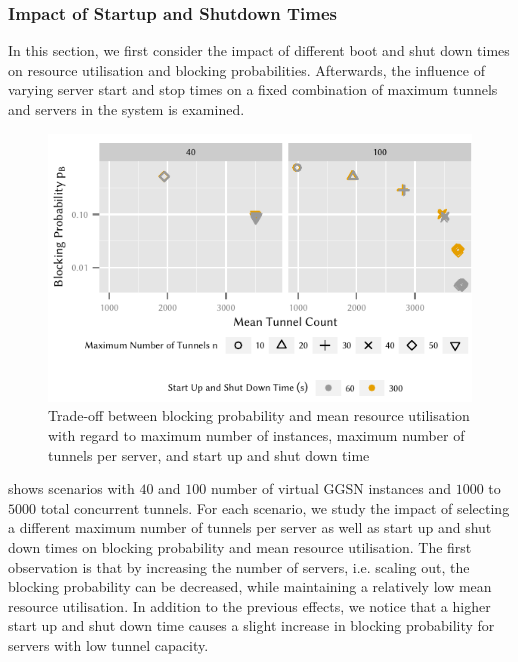 \subsubsection*{Impact of Startup and Shutdown Times}\label{sec:cloud_virtualized_network_functions:startup_shutdown}

In this section, we first consider the impact of different boot and shut down times on resource utilisation and blocking probabilities.
Afterwards, the influence of varying server start and stop times on a fixed combination of maximum tunnels and servers in the system is examined.

\begin{figure}
  \centering
  \includegraphics{cloud/virtualized_network_functions/performance_evaluation/figures/compare_util_block}
  \caption{Trade-off between blocking probability and mean resource utilisation with regard to maximum number of instances, maximum number of tunnels per server, and start up and shut down time}
  \label{fig:cloud_virtualized_network_functions:startup_shutdown:compare_util_block}
\end{figure}

 shows scenarios with \(40\) and \(100\) number of virtual \gls{GGSN} instances and  \(1000\) to \(5000\) total concurrent tunnels.
For each scenario, we study the impact of selecting a different maximum number of tunnels per server as well as start up and shut down times on blocking probability and mean resource utilisation.
The first observation is that by increasing the number of servers, i.e. scaling out, the blocking probability can be decreased, while maintaining a relatively low mean resource utilisation.
In addition to the previous effects, we notice that a higher start up and shut down time causes a slight increase in blocking probability for servers with low tunnel capacity.

